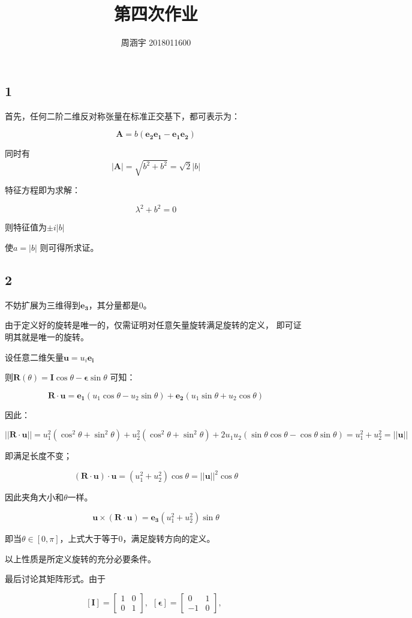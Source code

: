 \documentclass[UTF8,zihao=5]{ctexart}
\title{{\bfseries 第四次作业}}
\author{周涵宇 2018011600}
\date{}
\begin{document}
\maketitle

\subsection*{1}

首先，任何二阶二维反对称张量在标准正交基下，都可表示为：

$$
\bm{A}=b(\bm{e_2e_1-e_1e_2})
$$

同时有
$$
|\bm{A}|=\sqrt{b^2+b^2}=\sqrt{2}|b|
$$

特征方程即为求解：

$$
\lambda^2+b^2=0
$$

则特征值为$\pm i|b|$

使$a=|b|$
则可得所求证。

\subsection*{2}

不妨扩展为三维得到$\bm{e_3}$，其分量都是0。

由于定义好的旋转是唯一的，仅需证明对任意矢量旋转满足旋转的定义，
即可证明其就是唯一的旋转。

设任意二维矢量$\bm{u}=u_i\bm{e_i}$

则$\bm{R}(\theta)=\bm{I}\cos\theta-
\bm{\epsilon}\sin\theta$
可知：

$$
\bm{R\cdot u}=\bm{e_1}(u_1\cos\theta-u_2\sin\theta)
+\bm{e_2}(u_1\sin\theta+u_2\cos\theta)
$$

因此：

$$
||\bm{R\cdot u}|| = u_1^2(\cos^2\theta+\sin^2\theta)
+u_2^2(\cos^2\theta+\sin^2\theta)
+2u_1u_2(\sin\theta\cos\theta-\cos\theta\sin\theta)
=u_1^2+u_2^2=||\bm{u}||
$$

即满足长度不变；


$$
\bm{(R\cdot u)\cdot u}
=(u_1^2+u_2^2)\cos\theta=||\bm{u}||^2\cos\theta
$$

因此夹角大小和$\theta$一样。

$$
\bm{u\times (R\cdot u)}
=\bm{e_3}(u_1^2+u_2^2)\sin\theta
$$

即当$\theta\in[0,\pi]$，上式大于等于0，满足旋转方向的定义。

以上性质是所定义旋转的充分必要条件。

最后讨论其矩阵形式。由于

$$
[\bm{I}]=\begin{bmatrix}
    1&0\\0&1
\end{bmatrix},\ \ 
[\bm{\epsilon}]=\begin{bmatrix}
    0&1\\-1&0
\end{bmatrix},\ \ 
$$
\end{document}
